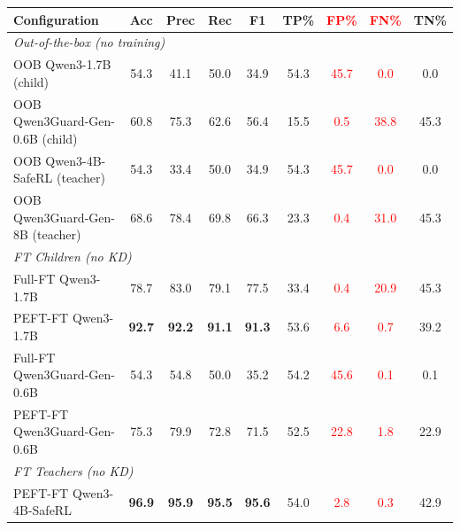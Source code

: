 
\begin{table}[t]
\centering
\tiny
\setlength{\tabcolsep}{3pt}
\begin{tabular}{lcccccccc}
\toprule
\textbf{Configuration} & \textbf{Acc} & \textbf{Prec} & \textbf{Rec} & \textbf{F1} & \textbf{TP\%} & \textbf{\textcolor{red}{FP\%}} & \textbf{\textcolor{red}{FN\%}} & \textbf{TN\%} \\
\midrule
\multicolumn{9}{l}{\textit{Out-of-the-box (no training)}} \\
OOB Qwen3-1.7B (child)                    & 54.3 & 41.1 & 50.0 & 34.9 & 54.3 & \textcolor{red}{45.7} & \textcolor{red}{0.0} & 0.0 \\
OOB Qwen3Guard-Gen-0.6B (child)           & 60.8 & 75.3 & 62.6 & 56.4 & 15.5 & \textcolor{red}{0.5} & \textcolor{red}{38.8} & 45.3 \\
OOB Qwen3-4B-SafeRL (teacher)             & 54.3 & 33.4 & 50.0 & 34.9 & 54.3 & \textcolor{red}{45.7} & \textcolor{red}{0.0} & 0.0 \\
OOB Qwen3Guard-Gen-8B (teacher)           & 68.6 & 78.4 & 69.8 & 66.3 & 23.3 & \textcolor{red}{0.4} & \textcolor{red}{31.0} & 45.3 \\
\midrule
\multicolumn{9}{l}{\textit{FT Children (no KD)}} \\
Full-FT Qwen3-1.7B                         & 78.7 & 83.0 & 79.1 & 77.5 & 33.4 & \textcolor{red}{0.4} & \textcolor{red}{20.9} & 45.3 \\
PEFT-FT Qwen3-1.7B                         & \textbf{92.7} & \textbf{92.2} & \textbf{91.1} & \textbf{91.3} & 53.6 & \textcolor{red}{6.6} & \textcolor{red}{0.7} & 39.2 \\
Full-FT Qwen3Guard-Gen-0.6B                & 54.3 & 54.8 & 50.0 & 35.2 & 54.2 & \textcolor{red}{45.6} & \textcolor{red}{0.1} & 0.1 \\
PEFT-FT Qwen3Guard-Gen-0.6B                & 75.3 & 79.9 & 72.8 & 71.5 & 52.5 & \textcolor{red}{22.8} & \textcolor{red}{1.8} & 22.9 \\
\midrule
\multicolumn{9}{l}{\textit{FT Teachers (no KD)}} \\
PEFT-FT Qwen3-4B-SafeRL                    & \textbf{96.9} & \textbf{95.9} & \textbf{95.5} & \textbf{95.6} & 54.0 & \textcolor{red}{2.8} & \textcolor{red}{0.3} & 42.9 \\

\end{tabular}
\end{table}
